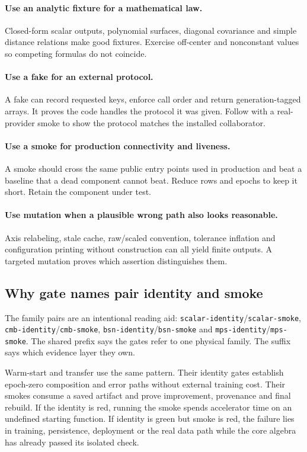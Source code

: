 \documentclass[10pt,aps,prd,twocolumn,nofootinbib]{revtex4-2}
\newcommand{\code}[1]{\texttt{#1}}
\begin{document}
\paragraph{Use an analytic fixture for a mathematical law.}
Closed-form scalar outputs, polynomial surfaces, diagonal covariance and
simple distance relations make good fixtures.  Exercise off-center and
nonconstant values so competing formulas do not coincide.

\paragraph{Use a fake for an external protocol.}
A fake can record requested keys, enforce call order and return
generation-tagged arrays.  It proves the code handles the protocol it was
given.  Follow with a real-provider smoke to show the protocol matches the
installed collaborator.

\paragraph{Use a smoke for production connectivity and liveness.}
A smoke should cross the same public entry points used in production and beat
a baseline that a dead component cannot beat.  Reduce rows and epochs to keep
it short.  Retain the component under test.

\paragraph{Use mutation when a plausible wrong path also looks reasonable.}
Axis relabeling, stale cache, raw/scaled convention, tolerance inflation and
configuration printing without construction can all yield finite outputs.
A targeted mutation proves which assertion distinguishes them.

\subsection{Why gate names pair identity and smoke}

The family pairs are an intentional reading aid:
\code{scalar-identity}/\code{scalar-smoke},
\code{cmb-identity}/\code{cmb-smoke},
\code{bsn-identity}/\code{bsn-smoke} and
\code{mps-identity}/\code{mps-smoke}.  The shared prefix says the gates refer
to one physical family.  The suffix says which evidence layer they own.

Warm-start and transfer use the same pattern.  Their identity gates establish
epoch-zero composition and error paths without external training cost.  Their
smokes consume a saved artifact and prove improvement, provenance and final
rebuild.  If the identity is red, running the smoke spends accelerator time on
an undefined starting function.  If identity is green but smoke is red, the
failure lies in training, persistence, deployment or the real data path
while the core algebra has already passed its isolated check.
\end{document}
